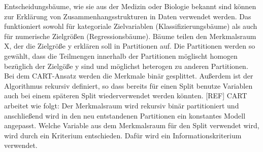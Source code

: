 Entscheidungsbäume, wie sie aus der Medizin oder Biologie bekannt sind
können zur Erklärung von Zusammenhangsstrukturen in Daten verwendet
werden. Das funktioniert sowohl für kategoriale Zielvariablen
(Klassifizierungsbäume) als auch für numerische Zielgrößen
(Regressionsbäume). Bäume teilen den Merkmalsraum X, der die Zielgröße
y erklären soll in Partitionen auf. Die Partitionen werden so gewählt,
dass die Teilmengen innerhalb der Partitionen möglischt homogen
bezüglich der Zielgöße y sind und möglichst heterogen zu anderen
Partitionen. Bei dem CART-Ansatz werden die Merkmale binär
gesplittet. Außerdem ist der Algorithmus rekursiv definiert, so dass
bereits für einen Split benutze Variablen auch bei einem späteren
Split wiederverwendet werden könnten. [REF]
CART arbeitet wie folgt: 
Der Merkmalsraum wird rekursiv binär partitioniert und anschließend
wird in den neu entstandenen Partitionen ein konstantes Modell
angepasst. Welche Variable aus dem Merkmalsraum für den Split
verwendet wird, wird durch ein Kriterium entschieden. Dafür wird ein
Informationskriterium verwendet. 

